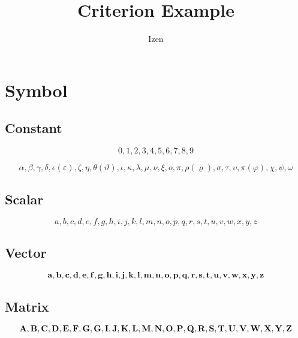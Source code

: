 \documentclass[a4paper,11pt]{article}
\title{Criterion Example}
\author{Izen}
\begin{document}

\section{Symbol} %
\label{sec:symbol}

\subsection{Constant} %
\label{sub:constant}

\begin{equation*}
0, 1, 2, 3, 4, 5, 6, 7, 8, 9
\end{equation*}

\begin{equation*}
\alpha, \beta, \gamma, \delta, \epsilon (\varepsilon), \zeta, \eta, \theta (\vartheta), \iota, \kappa, \lambda, \mu, \nu, \xi, o, \pi, \rho (\varrho), \sigma, \tau, \upsilon, \pi (\varphi), \chi, \psi, \omega
\end{equation*}

\subsection{Scalar}
\label{sub:scalar}

\begin{equation*}
a, b, c, d, e, f, g, h, i, j, k, l, m, n, o, p, q, r, s, t, u, v, w, x, y, z
\end{equation*}

\subsection{Vector}
\label{sub:vector}

\begin{equation*}
\mathbf{a}, \mathbf{b}, \mathbf{c}, \mathbf{d}, \mathbf{e}, \mathbf{f}, \mathbf{g}, \mathbf{h}, \mathbf{i}, \mathbf{j}, \mathbf{k}, \mathbf{l}, \mathbf{m}, \mathbf{n}, \mathbf{o}, \mathbf{p}, \mathbf{q}, \mathbf{r}, \mathbf{s}, \mathbf{t}, \mathbf{u}, \mathbf{v}, \mathbf{w}, \mathbf{x}, \mathbf{y}, \mathbf{z}
\end{equation*}

\subsection{Matrix}
\label{sub:matrix}

\begin{equation*}
\mathbf{A}, \mathbf{B}, \mathbf{C}, \mathbf{D}, \mathbf{E}, \mathbf{F}, \mathbf{G}, \mathbf{G}, \mathbf{I}, \mathbf{J}, \mathbf{K}, \mathbf{L}, \mathbf{M}, \mathbf{N}, \mathbf{O}, \mathbf{P}, \mathbf{Q}, \mathbf{R}, \mathbf{S}, \mathbf{T}, \mathbf{U}, \mathbf{V}, \mathbf{W}, \mathbf{X}, \mathbf{Y}, \mathbf{Z}
\end{equation*}
\end{document}
